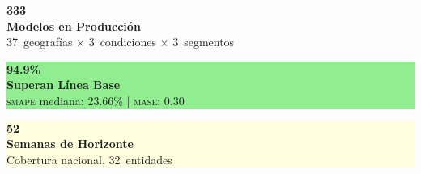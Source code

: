 \documentclass[12pt, letterpaper]{article}
\newcommand{\smape}{\textnormal{\textsc{smape}}}
\newcommand{\mase}{\textnormal{\textsc{mase}}}
\begin{document}
\begin{center}
\setlength{\fboxsep}{15pt}

\noindent
\begin{minipage}[t]{0.31\textwidth}
\centering
\colorbox{lightred}{%
\begin{minipage}[c][3.5cm]{\dimexpr\textwidth-30pt}
\centering
{\color{burgundy}\fontsize{36}{40}\selectfont\bfseries 333}\\[0.3cm]
{\small\bfseries Modelos en Producción}\\[0.15cm]
{\scriptsize\color{coolgray} 37~geografías\footnotemark{} $\times$ 3~condiciones $\times$ 3~segmentos}
\end{minipage}}
\end{minipage}\hfill
\begin{minipage}[t]{0.31\textwidth}
\centering
\colorbox{lightgreen}{%
\begin{minipage}[c][3.5cm]{\dimexpr\textwidth-30pt}
\centering
{\color{teal}\fontsize{36}{40}\selectfont\bfseries 94.9\%}\\[0.3cm]
{\small\bfseries Superan Línea Base}\\[0.15cm]
{\scriptsize\color{coolgray} \smape{} mediana: 23.66\% | \mase{}: 0.30}
\end{minipage}}
\end{minipage}\hfill
\begin{minipage}[t]{0.31\textwidth}
\centering
\colorbox{lightyellow}{%
\begin{minipage}[c][3.5cm]{\dimexpr\textwidth-30pt}
\centering
{\color{gold}\fontsize{36}{40}\selectfont\bfseries 52}\\[0.3cm]
{\small\bfseries Semanas de Horizonte}\\[0.15cm]
{\scriptsize\color{coolgray} Cobertura nacional, 32~entidades}
\end{minipage}}
\end{minipage}

\vspace{0.8cm}


\end{center}
\end{document}

